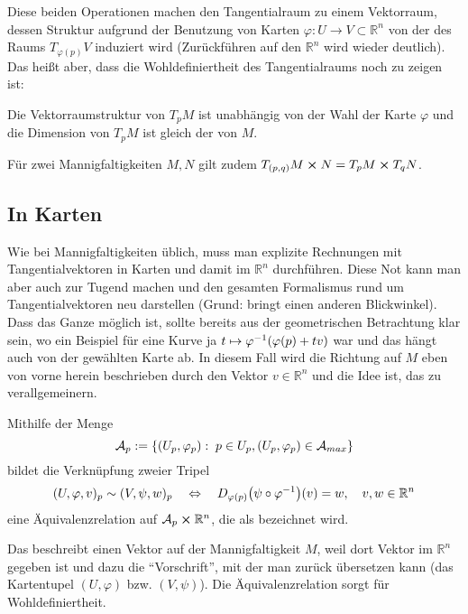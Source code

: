 \documentclass[../H_Analysis_main.tex]{subfiles}
\begin{document}
Diese beiden Operationen machen den Tangentialraum zu einem Vektorraum, dessen Struktur aufgrund der Benutzung von Karten $\varphi: U \rightarrow V \subset \mathbb{R}^n$ von der des Raums $T_{\varphi(p)} V$ induziert wird (Zurückführen auf den $\mathbb{R}^n$ wird wieder deutlich). Das heißt aber, dass die Wohldefiniertheit des Tangentialraums noch zu zeigen ist:

\begin{satz}[Eigenschaften $T_p M$]
Die Vektorraumstruktur von $T_p M$ ist unabhängig von der Wahl der Karte $\varphi$ und die Dimension von $T_p M$ ist gleich der von $M$.

Für zwei Mannigfaltigkeiten $M, N$ gilt zudem $T_{(p, q)} M \cross N = T_p M \cross T_q N$.
\end{satz}




		\subsection{In Karten}
Wie bei Mannigfaltigkeiten üblich, muss man explizite Rechnungen mit Tangentialvektoren in Karten und damit im $\mathbb{R}^n$ durchführen. Diese Not kann man aber auch zur Tugend machen und den gesamten Formalismus rund um Tangentialvektoren neu darstellen (Grund: bringt einen anderen Blickwinkel). Dass das Ganze möglich ist, sollte bereits aus der geometrischen Betrachtung klar sein, wo ein Beispiel für eine Kurve ja $t \mapsto \varphi^{-1}\qty(\varphi(p) + t v)$ war und das hängt auch von der gewählten Karte ab. In diesem Fall wird die Richtung auf $M$ eben von vorne herein beschrieben durch den Vektor $v \in \mathbb{R}^n$ und die Idee ist, das zu verallgemeinern.

\begin{defi}
Mithilfe der Menge
\begin{equation}
\mathcal{A}_p := \qty{(U_p, \varphi_p): \; p \in U_p, (U_p, \varphi_p) \in \mathcal{A}_{max}}
\end{equation}
bildet die Verknüpfung zweier Tripel
\begin{equation}
(U, \varphi, v)_p \sim (V, \psi, w)_p \quad \Leftrightarrow \quad D_{\varphi(p)} \qty(\psi \circ \varphi^{-1})(v) = w, \quad v, w \in \mathbb{R}^n
\end{equation}
eine Äquivalenzrelation auf $\mathcal{A}_p \cross \mathbb{R}^n$, die als  bezeichnet wird.
\end{defi}
Das beschreibt einen Vektor auf der Mannigfaltigkeit $M$, weil dort Vektor im $\mathbb{R}^n$ gegeben ist und dazu die \enquote{Vorschrift}, mit der man zurück übersetzen kann (das Kartentupel $(U, \varphi)$ bzw. $(V, \psi)$). Die Äquivalenzrelation sorgt für Wohldefiniertheit.
\end{document}

